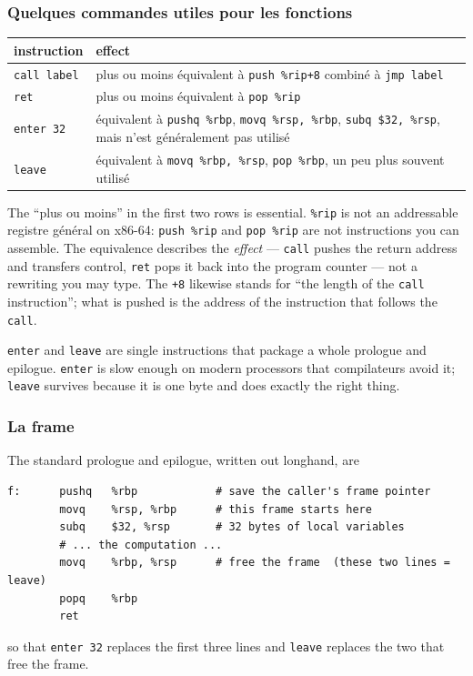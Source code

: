 \subsubsection{Quelques commandes utiles pour les fonctions}
\begin{center}
  \begin{tabularx}{\textwidth}{lX}
    \toprule
    instruction & effect \\
    \midrule
    \texttt{call label} &
      plus ou moins équivalent à \texttt{push \%rip+8} combiné à
      \texttt{jmp label} \\
    \texttt{ret} &
      plus ou moins équivalent à \texttt{pop \%rip} \\
    \texttt{enter 32} &
      équivalent à \texttt{pushq \%rbp}, \texttt{movq \%rsp, \%rbp},
      \texttt{subq \$32, \%rsp}, mais n'est généralement pas utilisé \\
    \texttt{leave} &
      équivalent à \texttt{movq \%rbp, \%rsp}, \texttt{pop \%rbp}, un peu plus
      souvent utilisé \\
    \bottomrule
  \end{tabularx}
\end{center}

\begin{remark}
  The ``plus ou moins'' in the first two rows is essential. \texttt{\%rip} is not
  an addressable registre général on x86-64: \texttt{push \%rip} and
  \texttt{pop \%rip} are not instructions you can assemble. The equivalence
  describes the \emph{effect} --- \texttt{call} pushes the return address and
  transfers control, \texttt{ret} pops it back into the program counter --- not
  a rewriting you may type. The \texttt{+8} likewise stands for ``the length of
  the \texttt{call} instruction''; what is pushed is the address of the
  instruction that follows the \texttt{call}.
\end{remark}

\begin{remark}
  \texttt{enter} and \texttt{leave} are single instructions that package a
  whole prologue and epilogue. \texttt{enter} is slow enough on modern
  processors that compilateurs avoid it; \texttt{leave} survives because it is
  one byte and does exactly the right thing.
\end{remark}

\subsubsection{La frame}
The standard prologue and epilogue, written out longhand, are
\begin{lstlisting}[language=gas]
f:      pushq   %rbp            # save the caller's frame pointer
        movq    %rsp, %rbp      # this frame starts here
        subq    $32, %rsp       # 32 bytes of local variables
        # ... the computation ...
        movq    %rbp, %rsp      # free the frame  (these two lines = leave)
        popq    %rbp
        ret
\end{lstlisting}
so that \texttt{enter 32} replaces the first three lines and \texttt{leave}
replaces the two that free the frame.

